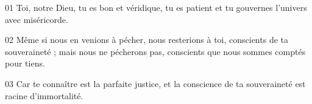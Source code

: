 01 Toi, notre Dieu, tu es bon et véridique, tu es patient et tu gouvernes l’univers avec miséricorde.

02 Même si nous en venions à pécher, nous resterions à toi, conscients de ta souveraineté ; mais nous ne pécherons pas, conscients que nous sommes comptés pour tiens.

03 Car te connaître est la parfaite justice, et la conscience de ta souveraineté est racine d’immortalité.
